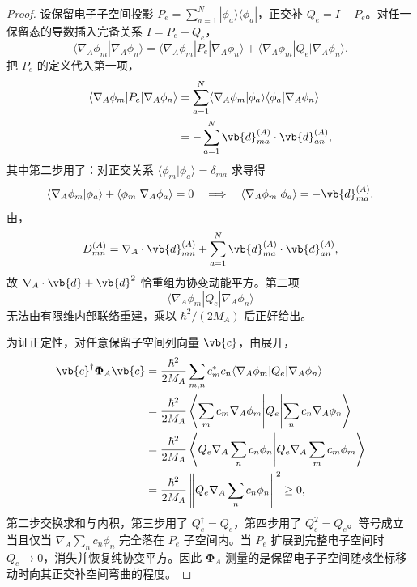 \begin{proof}
设保留电子子空间投影 \(P_e=\sum_{a=1}^N|\phi_a\rangle\langle\phi_a|\)，正交补 \(Q_e=I-P_e\)。对任一保留态的导数插入完备关系 \(I=P_e+Q_e\)，
\begin{equation*}
 \langle\nabla_A\phi_m|\nabla_A\phi_n\rangle
 =\langle\nabla_A\phi_m|P_e|\nabla_A\phi_n\rangle
 +\langle\nabla_A\phi_m|Q_e|\nabla_A\phi_n\rangle.
\end{equation*}
把 \(P_e\) 的定义代入第一项，
\begin{align*}
 \langle\nabla_A\phi_m|P_e|\nabla_A\phi_n\rangle
 &=\sum_{a=1}^N
 \langle\nabla_A\phi_m|\phi_a\rangle
 \langle\phi_a|\nabla_A\phi_n\rangle\\
 &=-\sum_{a=1}^N
 \vb{d}_{ma}^{(A)}\cdot\vb{d}_{an}^{(A)},
\end{align*}
其中第二步用了：对正交关系 \(\langle\phi_m|\phi_a\rangle=\delta_{ma}\) 求导得
\begin{equation*}
 \langle\nabla_A\phi_m|\phi_a\rangle
 +\langle\phi_m|\nabla_A\phi_a\rangle=0
 \quad\Longrightarrow\quad
 \langle\nabla_A\phi_m|\phi_a\rangle=-\vb{d}_{ma}^{(A)}.
\end{equation*}
由，
\begin{equation*}
 D_{mn}^{(A)}
 =\nabla_A\cdot\vb{d}_{mn}^{(A)}
 +\sum_{a=1}^N\vb{d}_{ma}^{(A)}\cdot\vb{d}_{an}^{(A)},
\end{equation*}
故 \(\nabla_A\cdot\vb{d}+\vb{d}^2\) 恰重组为协变动能平方。第二项
\begin{equation*}
 \langle\nabla_A\phi_m|Q_e|\nabla_A\phi_n\rangle
\end{equation*}
无法由有限维内部联络重建，乘以 \(\hbar^2/(2M_A)\) 后正好给出。

为证正定性，对任意保留子空间列向量 \(\vb{c}\)，由展开，
\begin{align*}
 \vb{c}^\dagger\boldsymbol\Phi_A\vb{c}
 &=\frac{\hbar^2}{2M_A}\sum_{m,n}c_m^*c_n
 \langle\nabla_A\phi_m|Q_e|\nabla_A\phi_n\rangle\\
 &=\frac{\hbar^2}{2M_A}
 \left\langle \sum_m c_m\nabla_A\phi_m\middle|Q_e\middle|\sum_n c_n\nabla_A\phi_n\right\rangle\\
 &=\frac{\hbar^2}{2M_A}
 \left\langle Q_e\nabla_A\sum_n c_n\phi_n\middle|
 Q_e\nabla_A\sum_m c_m\phi_m\right\rangle\\
 &=\frac{\hbar^2}{2M_A}
 \left\|Q_e\nabla_A\sum_n c_n\phi_n\right\|^2\ge0,
\end{align*}
第二步交换求和与内积，第三步用了 \(Q_e^\dagger=Q_e\)，第四步用了 \(Q_e^2=Q_e\)。等号成立当且仅当 \(\nabla_A\sum_n c_n\phi_n\) 完全落在 \(P_e\) 子空间内。当 \(P_e\) 扩展到完整电子空间时 \(Q_e\to0\)，消失并恢复纯协变平方。因此 \(\boldsymbol\Phi_A\) 测量的是保留电子子空间随核坐标移动时向其正交补空间弯曲的程度。
\end{proof}

